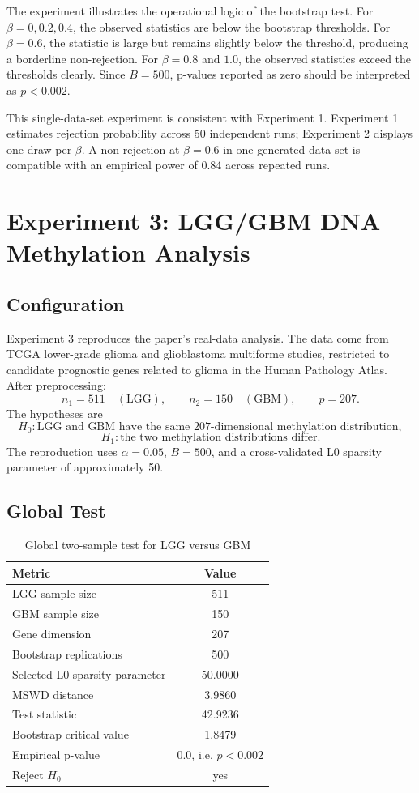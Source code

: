 \documentclass[a4paper,11pt]{article}
\begin{document}
The experiment illustrates the operational logic of the bootstrap test. For \(\beta=0,0.2,0.4\), the observed statistics are below the bootstrap thresholds. For \(\beta=0.6\), the statistic is large but remains slightly below the threshold, producing a borderline non-rejection. For \(\beta=0.8\) and \(1.0\), the observed statistics exceed the thresholds clearly. Since \(B=500\), p-values reported as zero should be interpreted as \(p<0.002\).

This single-data-set experiment is consistent with Experiment 1. Experiment 1 estimates rejection probability across 50 independent runs; Experiment 2 displays one draw per \(\beta\). A non-rejection at \(\beta=0.6\) in one generated data set is compatible with an empirical power of 0.84 across repeated runs.

\section{Experiment 3: LGG/GBM DNA Methylation Analysis}

\subsection{Configuration}

Experiment 3 reproduces the paper's real-data analysis. The data come from TCGA lower-grade glioma and glioblastoma multiforme studies, restricted to candidate prognostic genes related to glioma in the Human Pathology Atlas. After preprocessing:
\[
n_1=511\quad(\mathrm{LGG}),\qquad n_2=150\quad(\mathrm{GBM}),\qquad p=207.
\]
The hypotheses are
\[
H_0:\text{LGG and GBM have the same 207-dimensional methylation distribution},
\]
\[
H_1:\text{the two methylation distributions differ}.
\]
The reproduction uses \(\alpha=0.05\), \(B=500\), and a cross-validated L0 sparsity parameter of approximately 50.

\subsection{Global Test}

\begin{table}[H]
\centering
\caption{Global two-sample test for LGG versus GBM}
\begin{tabular}{lc}
\toprule
Metric & Value \\
\midrule
LGG sample size & 511 \\
GBM sample size & 150 \\
Gene dimension & 207 \\
Bootstrap replications & 500 \\
Selected L0 sparsity parameter & 50.0000 \\
MSWD distance & 3.9860 \\
Test statistic & 42.9236 \\
Bootstrap critical value & 1.8479 \\
Empirical p-value & 0.0, i.e. \(p<0.002\) \\
Reject \(H_0\) & yes \\
\bottomrule
\end{tabular}
\end{table}
\end{document}
